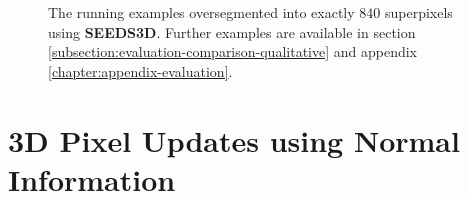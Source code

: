 \begin{figure}[t]
{	}
	\caption[The running examples oversegmented by an extension of \textbf{SEEDS} \cite{VanDenBerghBoixRoigCapitaniVanGool:2012} using 3D point coordinates for pixel updates.]{The running examples oversegmented into exactly $840$ superpixels using \textbf{SEEDS3D}. Further examples are available in section \ref{subsection:evaluation-comparison-qualitative} and appendix \ref{chapter:appendix-evaluation}.}
	\label{fig:seeds-depth-3d-mean-pixels-comparison}
\end{figure}

\section{3D Pixel Updates using Normal Information}
\label{section:seeds-depth-3d-normal-mean-pixel-updates}

